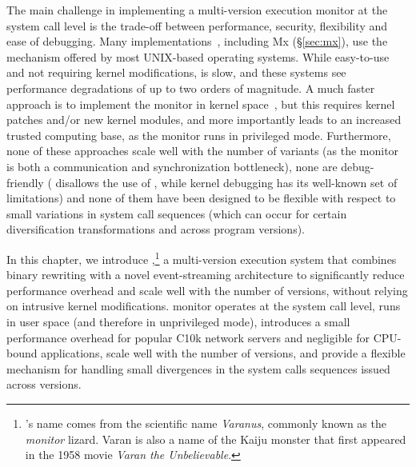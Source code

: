 The main challenge in implementing a multi-version execution monitor at the
system call level is the trade-off between performance, security, flexibility
and ease of debugging.  Many
implementations~\cite{orchestra09,tachyon12}, including
Mx (\S\ref{sec:mx}), use the  mechanism offered by most UNIX-based
operating systems.  While easy-to-use and not requiring kernel modifications,
 is slow, and these systems see performance degradations of up to
two orders of magnitude. A much faster approach is to implement the monitor in
kernel space~\cite{cox2006}, but this requires kernel patches and/or new kernel
modules, and more importantly leads to an increased trusted computing base, as
the monitor runs in privileged mode.  Furthermore, none of these approaches
scale well with the number of variants (as the monitor is both a communication
and synchronization bottleneck), none are debug-friendly (
disallows the use of , while kernel debugging has its well-known set
of limitations) and none of them have been designed to be flexible with respect
to small variations in system call sequences (which can occur for certain
diversification transformations and across program versions).


In this chapter, we introduce \nx,\footnote{\varan's name comes from the
scientific name \emph{Varanus}, commonly known as the \emph{monitor} lizard.
Varan is also a name of the Kaiju monster that first appeared in the 1958 movie
\emph{Varan the Unbelievable}.} a multi-version execution system that
combines binary rewriting with a novel event-streaming architecture to
significantly reduce performance overhead and scale well with the number of
versions, without relying on intrusive kernel modifications. \nx monitor
operates at the system call level, runs in user space (and therefore in
unprivileged mode), introduces a small performance overhead for popular C10k
network servers and negligible for CPU-bound applications, scale well with the
number of versions, and provide a flexible mechanism for handling small
divergences in the system calls sequences issued across versions.





